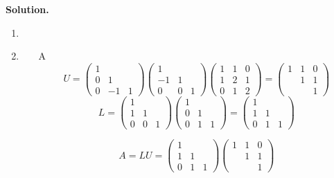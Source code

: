 \documentclass[english,onecolumn]{IEEEtran}
\begin{document}
\noindent\textbf{Solution.}
\begin{enumerate}
    \item 

    \item
    \begin{itemize}
    	\item [A]
    	$$U=\begin{pmatrix}
    	1 &  &  \\ 
    	0& 1 &  \\ 
    	0& -1 & 1
    	\end{pmatrix} 
    	\begin{pmatrix}
    	1 &  &  \\ 
    	-1& 1 &  \\ 
    	0& 0 & 1
    	\end{pmatrix}
    	\begin{pmatrix}
    	1 &1  &0  \\ 
    	1& 2 &1  \\ 
    	0& 1& 2
    	\end{pmatrix}=\begin{pmatrix}
    	1 &1  &0  \\ 
    	& 1 & 1 \\ 
    	&  & 1
    	\end{pmatrix}$$
    	$$L=\begin{pmatrix}
    	1 &  &  \\ 
    	1& 1 &  \\ 
    	0& 0 & 1
    	\end{pmatrix}
    	\begin{pmatrix}
    	1 &  &  \\ 
    	0& 1 &  \\ 
    	0& 1 & 1
    	\end{pmatrix}=\begin{pmatrix}
    	1 &  &  \\ 
    	1& 1 &  \\ 
    	0 & 1 & 1
    	\end{pmatrix}$$
    	
    	    	$$A=LU =\begin{pmatrix}
    	1 &  &  \\ 
    	1& 1 &  \\ 
    	0 & 1 & 1
    	\end{pmatrix}\begin{pmatrix}
    	1 &1  &0  \\ 
    	& 1 & 1 \\ 
    	&  & 1
    	\end{pmatrix}$$
    	

\end{itemize}
\end{enumerate}
\end{document}
